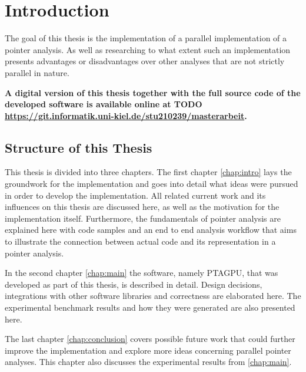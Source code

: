 \chapter{Introduction} \label{chap:intro}
The goal of this thesis is the implementation of a parallel implementation of a pointer analysis. As well as researching to what extent such an implementation presents advantages or disadvantages over other analyses that are not strictly parallel in nature.
\begin{center}
    \textbf{A digital version of this thesis together with the full source code of the developed software is available online at TODO\\
        \href{https://git.informatik.uni-kiel.de/stu210239/masterarbeit}{https://git.informatik.uni-kiel.de/stu210239/masterarbeit}.}
\end{center}
\section{Structure of this Thesis}
This thesis is divided into three chapters.
The first chapter \autoref{chap:intro} lays the groundwork for the implementation and goes into detail what ideas were pursued in order to develop the implementation. All related current work and its influences on this thesis are discussed here, as well as the motivation for the implementation itself. Furthermore, the fundamentals of pointer analysis are explained here with code samples and an end to end analysis workflow that aims to illustrate the connection between actual code and its representation in a pointer analysis.

In the second chapter \autoref{chap:main} the software, namely PTAGPU, that was developed as part of this thesis, is described in detail. Design decisions, integrations with other software libraries and correctness are elaborated here.
The experimental benchmark results and how they were generated are also presented here.

The last chapter \autoref{chap:conclusion} covers possible future work that could further improve the implementation and explore more ideas concerning parallel pointer analyses.
This chapter also discusses the experimental results from \autoref{chap:main}.


